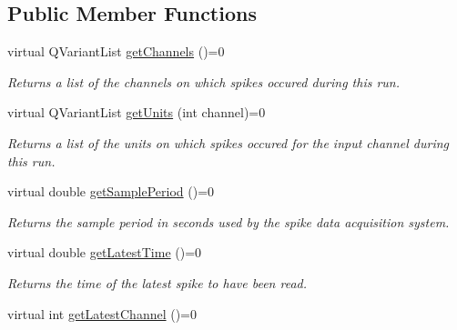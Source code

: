 \subsection*{Public Member Functions}
\begin{DoxyCompactItemize}
\item 
\hypertarget{class_picto_1_1_spike_reader_a28de2c880bc36d64aebf1eb203c86fa2}{virtual Q\-Variant\-List \hyperlink{class_picto_1_1_spike_reader_a28de2c880bc36d64aebf1eb203c86fa2}{get\-Channels} ()=0}\label{class_picto_1_1_spike_reader_a28de2c880bc36d64aebf1eb203c86fa2}

\begin{DoxyCompactList}\small\item\em Returns a list of the channels on which spikes occured during this run. \end{DoxyCompactList}\item 
\hypertarget{class_picto_1_1_spike_reader_afcfb6f4ae71e15799fb635a3a0422a27}{virtual Q\-Variant\-List \hyperlink{class_picto_1_1_spike_reader_afcfb6f4ae71e15799fb635a3a0422a27}{get\-Units} (int channel)=0}\label{class_picto_1_1_spike_reader_afcfb6f4ae71e15799fb635a3a0422a27}

\begin{DoxyCompactList}\small\item\em Returns a list of the units on which spikes occured for the input channel during this run. \end{DoxyCompactList}\item 
\hypertarget{class_picto_1_1_spike_reader_af7519da47a5774ae891835503cf5217c}{virtual double \hyperlink{class_picto_1_1_spike_reader_af7519da47a5774ae891835503cf5217c}{get\-Sample\-Period} ()=0}\label{class_picto_1_1_spike_reader_af7519da47a5774ae891835503cf5217c}

\begin{DoxyCompactList}\small\item\em Returns the sample period in seconds used by the spike data acquisition system. \end{DoxyCompactList}\item 
\hypertarget{class_picto_1_1_spike_reader_a1e1dc52fa0a5bf78a77b61f809ab84b4}{virtual double \hyperlink{class_picto_1_1_spike_reader_a1e1dc52fa0a5bf78a77b61f809ab84b4}{get\-Latest\-Time} ()=0}\label{class_picto_1_1_spike_reader_a1e1dc52fa0a5bf78a77b61f809ab84b4}

\begin{DoxyCompactList}\small\item\em Returns the time of the latest spike to have been read. \end{DoxyCompactList}\item 
\hypertarget{class_picto_1_1_spike_reader_a4176810072b8bcb4138068c8269223e0}{virtual int \hyperlink{class_picto_1_1_spike_reader_a4176810072b8bcb4138068c8269223e0}{get\-Latest\-Channel} ()=0}\label{class_picto_1_1_spike_reader_a4176810072b8bcb4138068c8269223e0}


\end{DoxyCompactItemize}

